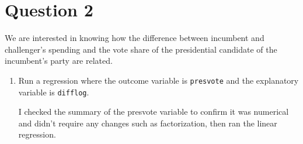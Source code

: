 \documentclass[12pt,letterpaper]{article}
\begin{document}
\section*{Question 2}
\noindent We are interested in knowing how the difference between incumbent and challenger's spending and the vote share of the presidential candidate of the incumbent's party are related.	\vspace{.1cm}
	\begin{enumerate}
		\item Run a regression where the outcome variable is \texttt{presvote} and the explanatory variable is \texttt{difflog}.
		
		
		\noindent I checked the summary of the presvote variable to confirm it was numerical and didn't require any changes such as factorization, then ran the linear regression. \\
		

\end{enumerate}
\end{document}
